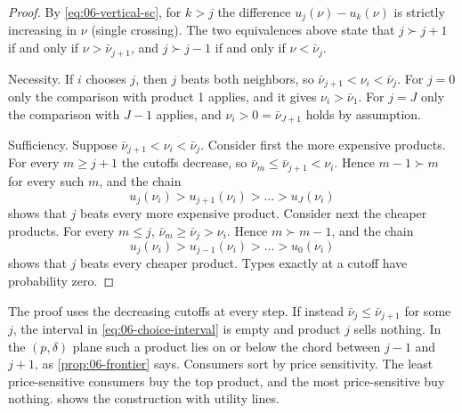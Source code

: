 \begin{proof}
By \eqref{eq:06-vertical-sc}, for $k > j$ the difference $u_j(\nu) - u_k(\nu)$ is strictly increasing in $\nu$
(single crossing). The two equivalences above state that $j \succ j+1$ if and only if $\nu > \bar\nu_{j+1}$,
and $j \succ j-1$ if and only if $\nu < \bar\nu_j$.

Necessity. If $i$ chooses $j$, then $j$ beats both neighbors, so $\bar\nu_{j+1} < \nu_i < \bar\nu_j$. For
$j = 0$ only the comparison with product 1 applies, and it gives $\nu_i > \bar\nu_1$. For $j = J$ only the
comparison with $J - 1$ applies, and $\nu_i > 0 = \bar\nu_{J+1}$ holds by assumption.

Sufficiency. Suppose $\bar\nu_{j+1} < \nu_i < \bar\nu_j$. Consider first the more expensive products. For
every $m \ge j + 1$ the cutoffs decrease, so $\bar\nu_m \le \bar\nu_{j+1} < \nu_i$. Hence $m - 1 \succ m$ for
every such $m$, and the chain
\begin{equation*}
  u_j(\nu_i) > u_{j+1}(\nu_i) > \dots > u_J(\nu_i)
\end{equation*}
shows that $j$ beats every more expensive product. Consider next the cheaper products. For every
$m \le j$, $\bar\nu_m \ge \bar\nu_j > \nu_i$. Hence $m \succ m - 1$, and the chain
\begin{equation*}
  u_j(\nu_i) > u_{j-1}(\nu_i) > \dots > u_0(\nu_i)
\end{equation*}
shows that $j$ beats every cheaper product. Types exactly at a cutoff have probability zero.
\end{proof}

The proof uses the decreasing cutoffs at every step. If instead $\bar\nu_j \le \bar\nu_{j+1}$ for some $j$,
the interval in \eqref{eq:06-choice-interval} is empty and product $j$ sells nothing. In the $(p,\delta)$
plane such a product lies on or below the chord between $j - 1$ and $j + 1$, as \cref{prop:06-frontier}
says. Consumers sort by price sensitivity. The least price-sensitive consumers buy the top product, and
the most price-sensitive buy nothing.  shows the construction with utility lines.

